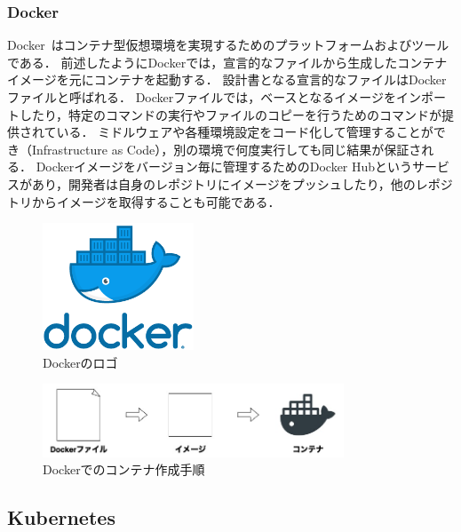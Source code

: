 \subsubsection{Docker}
\label{background:container-orchestration-system:container:docker}

Docker~\cite{Docker}はコンテナ型仮想環境を実現するためのプラットフォームおよびツールである．
前述したようにDockerでは，宣言的なファイルから生成したコンテナイメージを元にコンテナを起動する．
設計書となる宣言的なファイルはDockerファイルと呼ばれる．
Dockerファイルでは，ベースとなるイメージをインポートしたり，特定のコマンドの実行やファイルのコピーを行うためのコマンドが提供されている．
ミドルウェアや各種環境設定をコード化して管理することができ（Infrastructure as Code），別の環境で何度実行しても同じ結果が保証される．
Dockerイメージをバージョン毎に管理するためのDocker Hubというサービスがあり，開発者は自身のレポジトリにイメージをプッシュしたり，他のレポジトリからイメージを取得することも可能である．

\begin{figure}[htbp]
\begin{center}
    \includegraphics[width=0.4\textwidth]{./figures/docker-logo.png}
    \caption{Dockerのロゴ}
\end{center}
\end{figure}

\begin{figure}[htbp]
\begin{center}
    \includegraphics[width=0.8\textwidth]{./figures/docker-process.jpg}
    \caption{Dockerでのコンテナ作成手順}
\end{center}
\end{figure}

\subsection{Kubernetes}
\label{background:container-orchestration-system:kubernetes}

